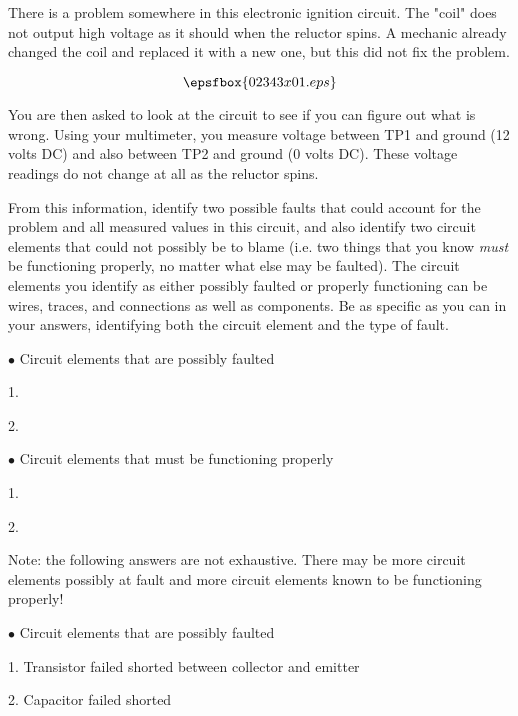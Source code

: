 

There is a problem somewhere in this electronic ignition circuit.  The "coil" does not output high voltage as it should when the reluctor spins.  A mechanic already changed the coil and replaced it with a new one, but this did not fix the problem.

$$\epsfbox{02343x01.eps}$$

You are then asked to look at the circuit to see if you can figure out what is wrong.  Using your multimeter, you measure voltage between TP1 and ground (12 volts DC) and also between TP2 and ground (0 volts DC).  These voltage readings do not change at all as the reluctor spins.

From this information, identify two possible faults that could account for the problem and all measured values in this circuit, and also identify two circuit elements that could not possibly be to blame (i.e. two things that you know {\it must} be functioning properly, no matter what else may be faulted).  The circuit elements you identify as either possibly faulted or properly functioning can be wires, traces, and connections as well as components.  Be as specific as you can in your answers, identifying both the circuit element and the type of fault.

\medskip
\goodbreak
\item{$\bullet$} Circuit elements that are possibly faulted
\item{1.}
\item{2.} 
\medskip

\medskip
\goodbreak
\item{$\bullet$} Circuit elements that must be functioning properly
\item{1.} 
\item{2.} 
\medskip







Note: the following answers are not exhaustive.  There may be more circuit elements possibly at fault and more circuit elements known to be functioning properly!

\medskip
\goodbreak
\item{$\bullet$} Circuit elements that are possibly faulted
\item{1.} Transistor failed shorted between collector and emitter
\item{2.} Capacitor failed shorted
\medskip

